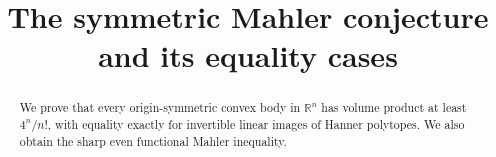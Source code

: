 \documentclass[11pt,a4paper]{amsart}
\title{The symmetric Mahler conjecture and its equality cases}
\author{}
\date{}
\begin{document}
\begin{abstract}
We prove that every origin-symmetric convex body in $\mathbb{R}^n$ has volume product at least $4^n/n!$, with equality exactly for invertible linear images of Hanner polytopes. We also obtain the sharp even functional Mahler inequality.
\end{abstract}

\maketitle










\printbibliography
\end{document}
